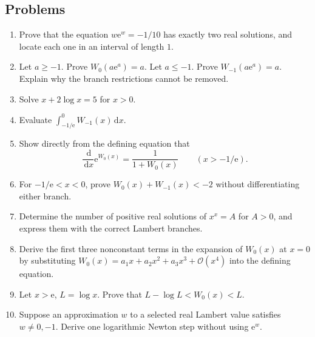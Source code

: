 \documentclass[11pt]{article}
\theoremstyle{remark}
\newcommand{\ee}{\mathrm e}
\newcommand{\bigO}{\mathcal O}
\newcommand{\dd}{\,\mathrm d}
\begin{document}
\subsection*{Problems}
\begin{enumerate}[label=\textbf{P\arabic*.},leftmargin=*]
\item Prove that the equation \(w\ee^w=-1/10\) has exactly two real
solutions, and locate each one in an interval of length \(1\).

\item Let \(a\geq-1\).  Prove \(W_0(a\ee^a)=a\).  Let \(a\leq-1\).
Prove \(W_{-1}(a\ee^a)=a\).  Explain why the branch restrictions cannot be
removed.

\item Solve \(x+2\log x=5\) for \(x>0\).

\item Evaluate
\(\displaystyle\int_{-1/\ee}^{0}W_{-1}(x)\dd x\).

\item Show directly from the defining equation that
\[
       \frac{\dd}{\dd x}\ee^{W_0(x)}
       =\frac1{1+W_0(x)}
       \qquad(x>-1/\ee).
\]

\item For \(-1/\ee<x<0\), prove
\(W_0(x)+W_{-1}(x)<-2\) without differentiating either branch.

\item Determine the number of positive real solutions of \(x^x=A\) for
\(A>0\), and express them with the correct Lambert branches.

\item Derive the first three nonconstant terms in the expansion of
\(W_0(x)\) at \(x=0\) by substituting
\(W_0(x)=a_1x+a_2x^2+a_3x^3+\bigO(x^4)\) into the defining equation.

\item Let \(x>\ee\), \(L=\log x\).  Prove that
\(L-\log L<W_0(x)<L\).

\item Suppose an approximation \(w\) to a selected real Lambert value
satisfies \(w\neq0,-1\).  Derive one logarithmic Newton step without using
\(\ee^w\).
\end{enumerate}
\end{document}
